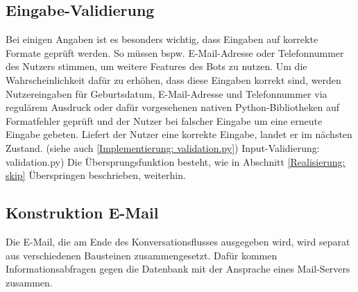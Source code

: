         \subsection{Eingabe-Validierung} \label{Realisierung: Validation}
        Bei einigen Angaben ist es besonders wichtig, dass Eingaben auf korrekte Formate geprüft werden. So müssen bspw. E-Mail-Adresse oder Telefonnummer des Nutzers stimmen, um weitere Features des Bots zu nutzen. Um die Wahrscheinlichkeit dafür zu erhöhen, dass diese Eingaben korrekt sind, werden Nutzereingaben für Geburtsdatum, E-Mail-Adresse und Telefonnummer via regulärem Ausdruck oder dafür vorgesehenen nativen Python-Bibliotheken auf Formatfehler geprüft und der Nutzer bei falscher Eingabe um eine erneute Eingabe gebeten. Liefert der Nutzer eine korrekte Eingabe, landet er im nächsten Zustand. (siehe auch \ref*{Implementierung: validation.py}) Input-Validierung: validation.py) Die Übersprungsfunktion besteht, wie in Abschnitt \ref*{Realisierung: skip} Überspringen beschrieben, weiterhin.
        
        \subsection{Konstruktion E-Mail} \label{Realisierung: email}
        Die E-Mail, die am Ende des Konversationsflusses ausgegeben wird, wird separat aus verschiedenen Bausteinen zusammengesetzt. Dafür kommen Informationsabfragen gegen die Datenbank mit der Ansprache eines Mail-Servers zusammen.
        
    

